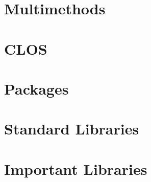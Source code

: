 \documentclass[11pt]{article}
\begin{document}
\section{Multimethods}
\label{sec-11}
\section{CLOS}
\label{sec-12}
\section{Packages}
\label{sec-13}
\section{Standard Libraries}
\label{sec-14}
\section{Important Libraries}
\label{sec-15}
\end{document}
